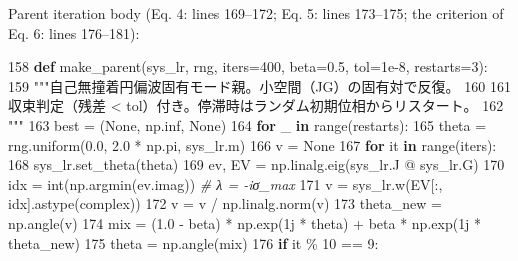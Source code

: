 \documentclass[
  a4paper,
]{ltjsarticle}
\newenvironment{Shaded}{}{}
\newcommand{\BuiltInTok}[1]{\textcolor[rgb]{0.00,0.50,0.00}{#1}}
\newcommand{\CommentTok}[1]{\textcolor[rgb]{0.38,0.63,0.69}{\textit{#1}}}
\newcommand{\ControlFlowTok}[1]{\textcolor[rgb]{0.00,0.44,0.13}{\textbf{#1}}}
\newcommand{\DecValTok}[1]{\textcolor[rgb]{0.25,0.63,0.44}{#1}}
\newcommand{\FloatTok}[1]{\textcolor[rgb]{0.25,0.63,0.44}{#1}}
\newcommand{\KeywordTok}[1]{\textcolor[rgb]{0.00,0.44,0.13}{\textbf{#1}}}
\newcommand{\NormalTok}[1]{#1}
\newcommand{\OperatorTok}[1]{\textcolor[rgb]{0.40,0.40,0.40}{#1}}
\newcommand{\OtherTok}[1]{\textcolor[rgb]{0.00,0.44,0.13}{#1}}
\newcommand{\StringTok}[1]{\textcolor[rgb]{0.25,0.44,0.63}{#1}}
\newcommand{\VariableTok}[1]{\textcolor[rgb]{0.10,0.09,0.49}{#1}}
\begin{document}
Parent iteration body (Eq. 4: lines 169--172; Eq. 5: lines 173--175; the
criterion of Eq. 6: lines 176--181):

\begin{Shaded}
\begin{Highlighting}[]
   \DecValTok{158}  \KeywordTok{def}\NormalTok{ make\_parent(sys\_lr, rng, iters}\OperatorTok{=}\DecValTok{400}\NormalTok{, beta}\OperatorTok{=}\FloatTok{0.5}\NormalTok{, tol}\OperatorTok{=}\FloatTok{1e{-}8}\NormalTok{, restarts}\OperatorTok{=}\DecValTok{3}\NormalTok{):}
   \DecValTok{159}      \StringTok{"""自己無撞着円偏波固有モード親。小空間（JG）の固有対で反復。}
\StringTok{   160}
\StringTok{   161      収束判定（残差 \textless{} tol）付き。停滞時はランダム初期位相からリスタート。}
\StringTok{   162      """}
   \DecValTok{163}\NormalTok{      best }\OperatorTok{=}\NormalTok{ (}\VariableTok{None}\NormalTok{, np.inf, }\VariableTok{None}\NormalTok{)}
   \DecValTok{164}      \ControlFlowTok{for}\NormalTok{ \_ }\KeywordTok{in} \BuiltInTok{range}\NormalTok{(restarts):}
   \DecValTok{165}\NormalTok{          theta }\OperatorTok{=}\NormalTok{ rng.uniform(}\FloatTok{0.0}\NormalTok{, }\FloatTok{2.0} \OperatorTok{*}\NormalTok{ np.pi, sys\_lr.m)}
   \DecValTok{166}\NormalTok{          v }\OperatorTok{=} \VariableTok{None}
   \DecValTok{167}          \ControlFlowTok{for}\NormalTok{ it }\KeywordTok{in} \BuiltInTok{range}\NormalTok{(iters):}
   \DecValTok{168}\NormalTok{              sys\_lr.set\_theta(theta)}
   \DecValTok{169}\NormalTok{              ev, EV }\OperatorTok{=}\NormalTok{ np.linalg.eig(sys\_lr.J }\OperatorTok{@}\NormalTok{ sys\_lr.G)}
   \DecValTok{170}\NormalTok{              idx }\OperatorTok{=} \BuiltInTok{int}\NormalTok{(np.argmin(ev.imag))  }\CommentTok{\# λ = {-}iσ\_max}
   \DecValTok{171}\NormalTok{              v }\OperatorTok{=}\NormalTok{ sys\_lr.w(EV[:, idx].astype(}\BuiltInTok{complex}\NormalTok{))}
   \DecValTok{172}\NormalTok{              v }\OperatorTok{=}\NormalTok{ v }\OperatorTok{/}\NormalTok{ np.linalg.norm(v)}
   \DecValTok{173}\NormalTok{              theta\_new }\OperatorTok{=}\NormalTok{ np.angle(v)}
   \DecValTok{174}\NormalTok{              mix }\OperatorTok{=}\NormalTok{ (}\FloatTok{1.0} \OperatorTok{{-}}\NormalTok{ beta) }\OperatorTok{*}\NormalTok{ np.exp(}\OtherTok{1j} \OperatorTok{*}\NormalTok{ theta) }\OperatorTok{+}\NormalTok{ beta }\OperatorTok{*}\NormalTok{ np.exp(}\OtherTok{1j} \OperatorTok{*}\NormalTok{ theta\_new)}
   \DecValTok{175}\NormalTok{              theta }\OperatorTok{=}\NormalTok{ np.angle(mix)}
   \DecValTok{176}              \ControlFlowTok{if}\NormalTok{ it }\OperatorTok{\%} \DecValTok{10} \OperatorTok{==} \DecValTok{9}\NormalTok{:}

\end{Highlighting}
\end{Shaded}
\end{document}
